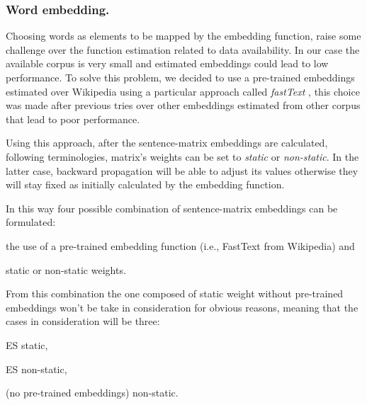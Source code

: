 \subsubsection{Word embedding.}
Choosing words as elements to be mapped by the embedding function, raise some challenge over the function estimation related to data availability. In our case the available corpus is very small and estimated embeddings could lead to low performance.
To solve this problem, we decided to use a pre-trained embeddings estimated over Wikipedia using a particular approach called \emph{fastText} \cite{bojanowski2016enriching}, this choice was made after previous tries over other embeddings estimated from other corpus that lead to poor performance.

Using this approach, after the sentence-matrix embeddings are calculated, following \cite{bojanowski2016enriching} terminologies, matrix's weights can be set to \emph{static} or \emph{non-static}. In the latter case, backward propagation will be able to adjust its values otherwise they will stay fixed as initially calculated by the embedding function.

In this way four possible combination of sentence-matrix embeddings can be formulated: 
\begin{enumerate*}
\item the use of a pre-trained embedding function (i.e., FastText from Wikipedia) and
\item static or non-static weights.
\end{enumerate*}
From this combination the one composed of static weight without pre-trained embeddings won't be take in consideration for obvious reasons, meaning that the cases in consideration will be three:
\begin{enumerate*}
	\item ES static,
	\item ES non-static,
	\item (no pre-trained embeddings) non-static.
\end{enumerate*}

\begin{comment}
From this combination the one composed of static weight without pre-trained embeddings won't be take in consideration for obvious reasons, while we decided to use two pre-trained function from Spanish (i.e., ES) and Catalan (i.e., CA) to see how the use of pre-trained embeddings of a similar language will perform in relation to static/non-static weights.
Meaning that the cases in consideration will be five:
\begin{enumerate*}
\item ES static,
\item CA static,
\item ES non-static,
\item CA non-static,
\item (no pre-trained embeddings) non-static.
\end{enumerate*}
\end{comment}

